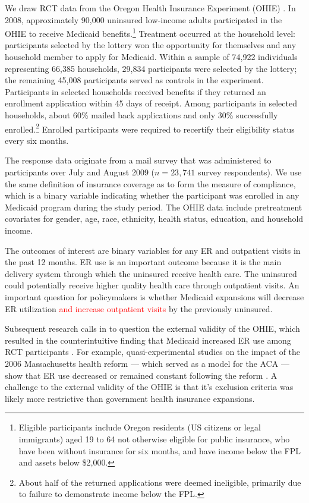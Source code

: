 \documentclass[hidelinks,12pt]{article}
\begin{document}
We draw RCT data from the Oregon Health Insurance Experiment (OHIE) \citep{finkelstein2012,baicker2013,baicker2014,Taubman}. In 2008, approximately 90,000 uninsured low-income adults participated in the OHIE to receive Medicaid benefits.\footnote{Eligible participants include Oregon residents (US citizens or legal immigrants) aged 19 to 64 not otherwise eligible for public insurance, who have been without insurance for six months, and have income below the FPL and assets below \$2,000.} Treatment occurred at the household level: participants selected by the lottery won the opportunity for themselves and any household member to apply for Medicaid. Within a sample of 74,922 individuals representing 66,385 households, 29,834 participants were selected by the lottery; the remaining 45,008 participants served as controls in the experiment. Participants in selected households received benefits if they returned an enrollment application within 45 days of receipt. Among participants in selected households, about 60\% mailed back applications and only 30\% successfully enrolled.\footnote{About half of the returned applications were deemed ineligible, primarily due to failure to demonstrate income below the FPL.} Enrolled participants were required to recertify their eligibility status every six months.

The response data originate from a mail survey that was administered to participants over July and August 2009 ($n = 23,741$ survey respondents). We use the same definition of insurance coverage as \citet{finkelstein2012} to form the measure of compliance, which is a binary variable indicating whether the participant was enrolled in any Medicaid program during the study period. The OHIE data include pretreatment covariates for gender, age, race, ethnicity, health status, education, and household income.  

The outcomes of interest are binary variables for any ER and outpatient visits in the past 12 months. ER use is an important outcome because it is the main delivery system through which the uninsured receive health care. The uninsured could potentially receive higher quality health care through outpatient visits. An important question for policymakers is whether Medicaid expansions will decrease ER utilization \textcolor{red}{and increase outpatient visits} by the previously uninsured.   	

Subsequent research calls in to question the external validity of the OHIE, which resulted in the counterintuitive finding that Medicaid increased ER use among RCT participants \citep{finkelstein2012,Taubman}. For example, quasi-experimental studies on the impact of the 2006 Massachusetts health reform --- which served as a model for the ACA --- show that ER use decreased or remained constant following the reform \citep{miller2012effect, kolstad2012impact}. A challenge to the external validity of the OHIE is that it's exclusion criteria was likely more restrictive than government health insurance expansions. 
\end{document}
